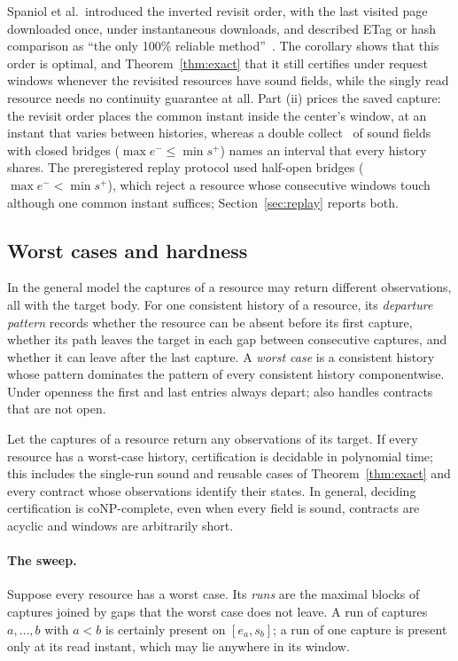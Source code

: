 Spaniol et al.\ introduced the inverted revisit order, with the last visited
page downloaded once, under instantaneous downloads, and described ETag or
hash comparison as ``the only 100\% reliable method''~\cite{spaniol2009}. The
corollary shows that this order is optimal, and Theorem~\ref{thm:exact} that
it still certifies under request windows whenever the revisited resources have
sound fields, while the singly read resource needs no continuity guarantee at
all.
Part (ii) prices the saved capture: the revisit order places the common
instant inside the center's window, at an instant that varies between
histories, whereas a double collect~\cite{afek1993} of sound fields with closed bridges
($\max e^-\le\min s^+$) names an interval that every history shares. The
preregistered replay protocol used half-open bridges ($\max e^-<\min s^+$),
which reject a resource whose consecutive windows touch although one common
instant suffices; Section~\ref{sec:replay} reports both.

\subsection{Worst cases and hardness}
In the general model the captures of a resource may return different
observations, all with the target body. For one consistent history of a
resource, its \emph{departure pattern} records whether the resource can be
absent before its first capture, whether its path leaves the target in each
gap between consecutive captures, and whether it can leave after the last
capture. A \emph{worst case} is a consistent history whose pattern dominates
the pattern of every consistent history componentwise. Under openness the
first and last entries always depart;  also handles
contracts that are not open.

\begin{proposition}\label{prop:hard}
Let the captures of a resource return any observations of its target. If every
resource has a worst-case history, certification is decidable in polynomial
time; this includes the single-run sound and reusable cases of
Theorem~\ref{thm:exact} and every contract whose observations identify their
states. In general, deciding certification is coNP-complete, even when every
field is sound, contracts are acyclic and windows are arbitrarily short.
\end{proposition}

\paragraph{The sweep.} Suppose every resource has a worst case. Its
\emph{runs} are the maximal blocks of captures joined by gaps that the worst
case does not leave. A run of captures $a,\dots,b$ with $a<b$ is certainly
present on $[e_a,s_b]$; a run of one capture is present only at its read
instant, which may lie anywhere in its window.

